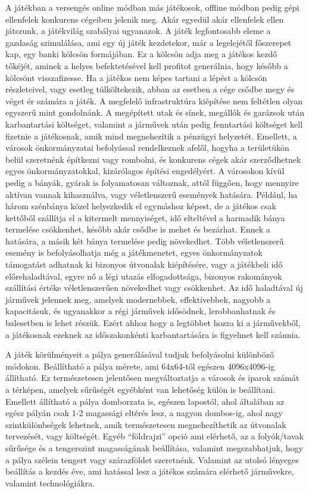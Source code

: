 A játékban a versengés online módban más játékosok, offline módban pedig gépi ellenfelek konkurens cégeiben jelenik meg. Akár egyedül akár ellenfelek ellen játszunk, a játékvilág szabályai ugyanazok. A játék legfontosabb eleme a gazdaság szimulálása, ami egy új játék kezdetekor, már a legelejétől főszerepet kap, egy banki kölcsön formájában. Ez a kölcsön adja meg a játékos kezdő tőkéjét, aminek a helyes befektetésével kell profitot generálnia, hogy később a kölcsönt visszafizesse. Ha a játékos nem képes tartani a lépést a kölcsön részleteivel, vagy esetleg túlköltekezik, abban az esetben a cége csődbe megy és véget ér számára a játék. A megfelelő infrastruktúra kiépítése nem feltétlen olyan egyszerű mint gondolnánk. A megépített utak és sínek, megállók és garázsok után karbantartási költséget, valamint a járművek után pedig fenntartási költséget kell fizetnie a játékosnak, amik mind megnehezítik a pénzügyi helyzetét. Emellett, a városok önkormányzatai befolyással rendelkeznek afelől, hogyha a területükön belül szeretnénk építkezni vagy rombolni, és konkurens cégek akár szerződhetnek egyes önkormányzatokkal, kizárólagos építési engedélyért. A városokon kívül pedig a bányák, gyárak is folyamatosan változnak, attól függően, hogy mennyire aktívan vannak kihasználva, vagy véletlenszerű események hatására. Például, ha három szénbánya közel helyezkedik el egymáshoz képest, de a játékos csak kettőből szállítja el a kitermelt mennyiséget, idő elteltével a harmadik bánya termelése csökkenhet, később akár csődbe is mehet és bezárhat. Ennek a hatására, a másik két bánya termelése pedig növekedhet. Több véletlenszerű esemény is befolyásolhatja még a játékmenetet, egyes önkormányzatok támogatást adhatnak ki bizonyos útvonalak kiépítésére, vagy a játékbeli idő előrehaladtával, egyre nő a légi utazás elfogadottsága, bizonyos rakományok szállítási értéke véletlenszerűen növekedhet vagy csökkenhet. Az idő haladtával új járművek jelennek meg, amelyek modernebbek, effektívebbek, nagyobb a kapacitásuk, és ugyanakkor a régi járművek idősödnek, lerobbanhatnak és balesetben is lehet részük. Ezért ahhoz hogy a legtöbbet hozza ki a járművekből, a játékosnak ezeknek az időszakonkénti karbantartására is figyelmet kell szánnia.

A játék körülményeit a pálya generálásával tudjuk befolyásolni különböző módokon. Beállítható a pálya mérete, ami 64x64-től egészen 4096x4096-ig állítható. Ez természetesen  jelentősen megváltoztatja a városok és iparok számát a térképen, amelyek sűrűségét egyébként van lehetőség külön is beállítani. Emellett állítható a pálya domborzata is, egészen lapostól, ahol általában az egész pályán csak 1-2 magassági eltérés lesz, a nagyon dombos-ig, ahol nagy szintkülönbségek lehetnek, amik természetesen megnehezíthetik az útvonalak tervezését, vagy költségét. Egyéb “földrajzi” opció ami elérhető, az a folyók/tavak sűrűsége és a tengerszint magasságának beállítása, valamint megszabhatjuk, hogy a pálya szélein tengert vagy szárazföldet szeretnénk. Valamint az utolsó lényeges beállítás a kezdés éve, ami hatással lesz a játékos számára elérhető járművekre, valamint technológiákra.

